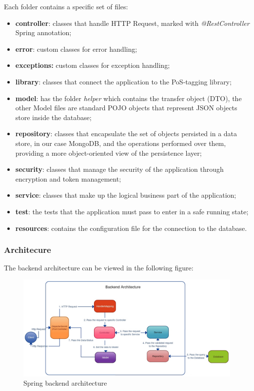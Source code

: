 Each folder contains a specific set of files:
\begin{itemize}
\item  \textbf{controller}: classes that handle HTTP Request, marked with \textit{@RestController} Spring annotation;
\item  \textbf{error}: custom classes for error handling;
\item  \textbf{exceptions:} custom classes for exception handling;
\item  \textbf{library}: classes that connect the application to the PoS-tagging library;
\item  \textbf{model}: has the folder \textit{helper} which contains the transfer object (DTO), the other Model files are standard POJO objects that represent JSON objects store inside the database;
\item  \textbf{repository}: classes that encapsulate the set of objects persisted in a data store, in our case MongoDB, and the operations performed over them, providing a more object-oriented view of the persistence layer;
\item  \textbf{security}: classes that manage the security of the application through encryption and token management;
\item  \textbf{service}: classes that make up the logical business part of the application;
\item  \textbf{test}: the tests that the application must pass to enter in a safe running state;
\item \textbf{resources}: contains the configuration file for the connection to the database.
\end{itemize}


\subsubsection{Architecure}
\label{sec:BackArchi}
The backend architecture can be viewed in the following figure:
\begin{figure}[H]
\centering 
\includegraphics[scale=1.80]{uml/SpringBackend.jpg} 
\caption{Spring backend architecture}
\label{fig:BackendArchitecture}
\end{figure}

